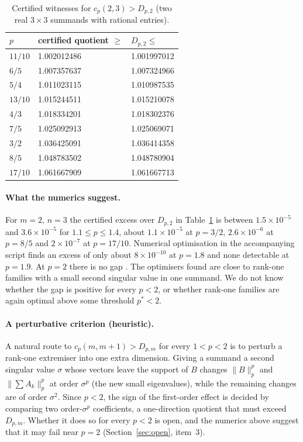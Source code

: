 \documentclass[11pt,a4paper]{article}
\numberwithin{equation}{section}
\theoremstyle{definition}
\theoremstyle{remark}
\begin{document}
\begin{table}[ht]
\centering
\small
\begin{tabular}{@{}lll@{}}
\toprule
\(p\) & certified quotient \(\ge\) & \(D_{p,2}\le\)\\
\midrule
\(11/10\) & 1.002012486 & 1.001997012\\
\(6/5\) & 1.007357637 & 1.007324966\\
\(5/4\) & 1.011023115 & 1.010987535\\
\(13/10\) & 1.015244511 & 1.015210078\\
\(4/3\) & 1.018334201 & 1.018302376\\
\(7/5\) & 1.025092913 & 1.025069071\\
\(3/2\) & 1.036425091 & 1.036414358\\
\(8/5\) & 1.048783502 & 1.048780904\\
\(17/10\) & 1.061667909 & 1.061667713\\
\bottomrule
\end{tabular}
\caption{Certified witnesses for \(c_p(2,3)>D_{p,2}\) (two real
\(3\times3\) summands with rational entries).}
\label{tab:cert}
\end{table}

\paragraph{What the numerics suggest.}
For \(m=2\), \(n=3\) the certified excess over \(D_{p,2}\) in
Table~\ref{tab:cert} is between \(1.5\times10^{-5}\) and
\(3.6\times10^{-5}\) for \(1.1\le p\le1.4\), about \(1.1\times10^{-5}\) at
\(p=3/2\), \(2.6\times10^{-6}\) at \(p=8/5\) and \(2\times10^{-7}\) at
\(p=17/10\). Numerical optimisation in the accompanying script finds an
excess of only about \(8\times10^{-10}\) at \(p=1.8\) and none detectable
at \(p=1.9\). At \(p=2\) there is no gap
\cite[Theorem 6.2]{Zhang}. The optimisers found are close to rank-one
families with a small second singular value in one summand. We do not know
whether the gap is positive for every \(p<2\), or whether rank-one families
are again optimal above some threshold \(p^*<2\).

\paragraph{A perturbative criterion (heuristic).}
A natural route to \(c_p(m,m+1)>D_{p,m}\) for every \(1<p<2\) is to perturb
a rank-one extremiser into one extra dimension. Giving a summand a second
singular value \(\sigma\) whose vectors leave the support of \(B\) changes
\(\|B\|_p^p\) and \(\|\sum A_k\|_p^p\) at order \(\sigma^p\) (the new
small eigenvalues), while the remaining changes are of order \(\sigma^2\).
Since \(p<2\), the sign of the first-order effect is decided by comparing
two order-\(\sigma^p\) coefficients, a one-direction quotient that must
exceed \(D_{p,m}\). Whether it does so for every \(p<2\) is open, and the
numerics above suggest that it may fail near \(p=2\)
(Section~\ref{sec:open}, item~3).
\end{document}
